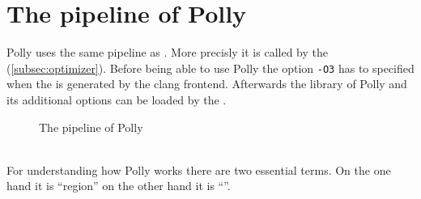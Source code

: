\section{The pipeline of Polly}
Polly uses the same pipeline as \llvm. More precisly it is called by the \opt (\autoref{subsec:optimizer}).
Before being able to use Polly the option \texttt{-O3} has to specified when the \llvmir is generated by the clang frontend.
Afterwards the library of Polly and its additional options can be loaded by the \opt.
\begin{figure}[h]
    \caption[The pipeline of Polly]{The pipeline of Polly \cite{PollyPresentation}}
    \centering
\end{figure}\\
For understanding how Polly works there are two essential terms. On the one hand it is \enquote{region} on the other hand it is \enquote{\scop}.

